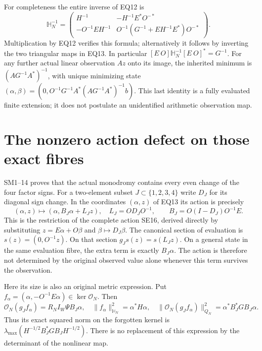 \documentclass[11pt]{article}
\begin{document}
For completeness the entire inverse of EQ12 is
\[
 \mathbb H_N^{-1}=
 \begin{pmatrix}
 H^{-1}&-H^{-1}E^*O^{-*}\\
 -O^{-1}EH^{-1}&O^{-1}(G^{-1}+EH^{-1}E^*)O^{-*}
 \end{pmatrix}.                                                     \tag{EQ15}
\]
Multiplication by EQ12 verifies this formula; alternatively it
follows by inverting the two triangular maps in EQ13.
In particular $[E\ O]\mathbb H_N^{-1}[E\ O]^*=G^{-1}$.
For any further actual linear observation $A z$ onto its image,
the inherited minimum is $(AG^{-1}A^*)^{-1}$, with unique minimizing
state $(\alpha,\beta)=(0,O^{-1}G^{-1}A^*(AG^{-1}A^*)^{-1}b)$.
This last identity is a fully evaluated finite extension; it does not
postulate an unidentified arithmetic observation map.

\section{The nonzero action defect on those exact fibres}
SM1--14 \cite{FC} proves that the actual monodromy contains every
even change of the four factor signs. For a two-element subset
$J\subset\{1,2,3,4\}$ write $D_J$ for its diagonal sign change.
In the coordinates $(\alpha,z)$ of EQ13 its action is precisely
\[
 (\alpha,z)\longmapsto(\alpha,B_J\alpha+L_Jz),\quad
 L_J=OD_JO^{-1},\qquad B_J=O(I-D_J)O^{-1}E.                           \tag{EQ16}
\]
This is the restriction of the complete action SE16, derived directly
by substituting $z=E\alpha+O\beta$ and $\beta\mapsto D_J\beta$.
The canonical section of evaluation is $s(z)=(0,O^{-1}z)$.
On that section $g_Js(z)=s(L_Jz)$. On a general state in the
same evaluation fibre, the extra term is exactly $B_J\alpha$.
The action is therefore not determined by the original observed
value alone whenever this term survives the observation.

Here its size is also an original metric expression. Put
$f_\alpha=(\alpha,-O^{-1}E\alpha)\in\ker\mathcal O_N$. Then
\[
 \mathcal O_N(g_J f_\alpha)=R_NI_W\Psi B_J\alpha,\quad
 \|f_\alpha\|_{\mathbb H_N}^2=\alpha^*H\alpha,\quad
 \|\mathcal O_N(g_J f_\alpha)\|_{Q_N}^2
       =\alpha^*B_J^*GB_J\alpha.                                   \tag{EQ17}
\]
Thus its exact squared norm on the forgotten kernel is
$\lambda_{\max}(H^{-1/2}B_J^*GB_JH^{-1/2})$. There is no replacement
of this expression by the determinant of the nonlinear map.
\end{document}
